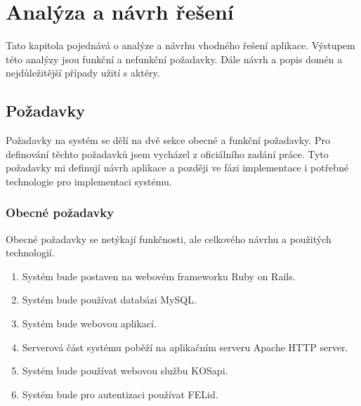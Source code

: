 \chapter{Analýza a návrh řešení}
Tato kapitola pojednává o analýze a návrhu vhodného řešení aplikace. Výstupem této analýzy jsou funkční a nefunkční požadavky. Dále návrh a popis domén a nejdůležitější případy užití s aktéry. 

\section{Požadavky}
Požadavky na systém se dělí na dvě sekce obecné a funkční požadavky. Pro definování těchto požadavků jsem vycházel z oficiálního zadání práce. Tyto požadavky mi definují návrh aplikace a později ve fázi implementace i potřebné technologie pro implementaci systému.
\subsection{Obecné požadavky}
Obecné požadavky se netýkají funkčnosti, ale celkového návrhu a použitých technologií.
\begin{enumerate}
\item Systém bude postaven na webovém frameworku Ruby on Rails.
\item Systém bude používat databázi MySQL.
\item Systém bude webovou aplikací.
\item Serverová část systému poběží na aplikačním serveru Apache HTTP server.
\item Systém bude používat webovou službu KOSapi.
\item Systém bude pro autentizaci používat FELid.
\end{enumerate}

